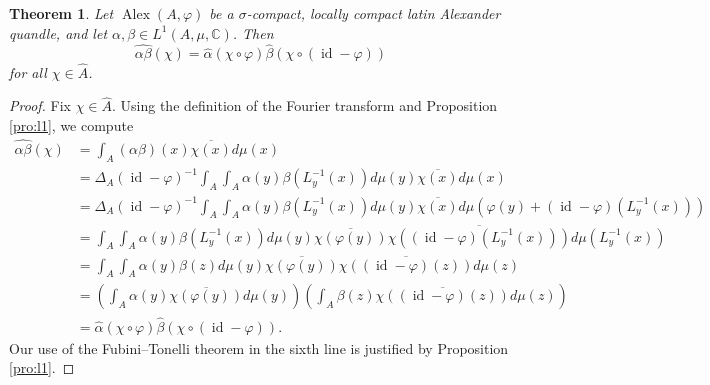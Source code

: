 \documentclass[10pt,a4paper]{amsart}
\newtheorem{thm}{Theorem}
\newcommand{\A}{\widehat{A}}
\def\Alex{\operatorname{Alex}}
\newcommand{\Alpha}{\widehat{\alpha}}
\newcommand{\Id}{\operatorname{id}}
\renewcommand{\phi}{\varphi}
\begin{document}
\begin{thm} 
    Let $\Alex(A,\phi)$ be a $\sigma$-compact, locally compact latin Alexander quandle, and let $\alpha,\beta\in L^1(A,\mu,\mathbb{C}) $. Then
    \[
    \widehat{\alpha \beta} (\chi)=\Alpha (\chi\circ\phi)\hat{\beta} (\chi\circ(\Id-\phi))
    \]
    for all $\chi\in\A$.
\end{thm}

\begin{proof}
    Fix $\chi\in\A$. Using the definition of the Fourier transform and Proposition \ref{pro:l1}, we compute
    \begin{align*}
        \widehat{\alpha\beta}(\chi)&=\int_{A}(\alpha\beta)(x)\overline{\chi(x)} d\mu(x) \\
        &=\Delta_A(\Id-\phi)^{-1} \int_{A}\int_{ A}\alpha (y)   \beta(L_{y}^{-1}(x))d\mu(y)\overline{\chi(x)} d\mu(x) \\
        &=\Delta_A(\Id-\phi)^{-1} \int_{A}\int_{ A}\alpha (y)   \beta(L_{y}^{-1}(x))d\mu(y)\overline{\chi(x)} d\mu(\phi(y)+(\Id-\phi)(L_y^{-1}(x)))\\
        &=  \int_{A}\int_{ A}\alpha (y)   \beta(L_{y}^{-1}(x))d\mu(y)\overline{\chi(\phi(y))}\overline{\chi((\Id-\phi)(L_y^{-1}(x)))} d\mu(  L_y^{-1}(x))\\
        &=  \int_{A}\int_{ A}\alpha (y)   \beta(z)d\mu(y)\overline{\chi(\phi(y))}\overline{\chi((\Id-\phi)(z))} d\mu(  z)\\
        &=\left(\int_{  A}\alpha (y)\overline {\chi(\phi(y))} d\mu(y)\right) \left(\int_{  A}\beta(z)\overline {\chi((\Id-\phi)(z))} d\mu(z)\right)\\
        &=\Alpha(\chi\circ\phi)\hat{\beta}(\chi\circ(\Id-\phi)).
    \end{align*}
  Our use of the Fubini--Tonelli theorem in the sixth line is justified by Proposition \ref{pro:l1}.
\end{proof}
\end{document}
